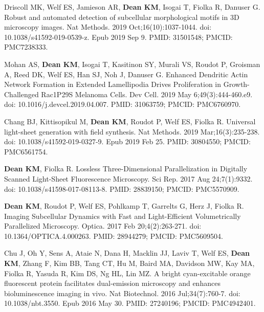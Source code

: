 \begin{etaremune}
\item Driscoll MK, Welf ES, Jamieson AR, \textbf{Dean KM}, Isogai T, Fiolka R, Danuser G. Robust and automated detection of subcellular morphological motifs in 3D microscopy images. Nat Methods. 2019 Oct;16(10):1037-1044. doi: 10.1038/s41592-019-0539-z. Epub 2019 Sep 9. PMID: 31501548; PMCID: PMC7238333.

\item Mohan AS, \textbf{Dean KM}, Isogai T, Kasitinon SY, Murali VS, Roudot P, Groisman A, Reed DK, Welf ES, Han SJ, Noh J, Danuser G. Enhanced Dendritic Actin Network Formation in Extended Lamellipodia Drives Proliferation in Growth-Challenged Rac1P29S Melanoma Cells. Dev Cell. 2019 May 6;49(3):444-460.e9. doi: 10.1016/j.devcel.2019.04.007. PMID: 31063759; PMCID: PMC6760970.

\item Chang BJ, Kittisopikul M, \textbf{Dean KM}, Roudot P, Welf ES, Fiolka R. Universal light-sheet generation with field synthesis. Nat Methods. 2019 Mar;16(3):235-238. doi: 10.1038/s41592-019-0327-9. Epub 2019 Feb 25. PMID: 30804550; PMCID: PMC6561754.

\item \textbf{Dean KM}, Fiolka R. Lossless Three-Dimensional Parallelization in Digitally Scanned Light-Sheet Fluorescence Microscopy. Sci Rep. 2017 Aug 24;7(1):9332. doi: 10.1038/s41598-017-08113-8. PMID: 28839150; PMCID: PMC5570909.

\item \textbf{Dean KM}, Roudot P, Welf ES, Pohlkamp T, Garrelts G, Herz J, Fiolka R. Imaging Subcellular Dynamics with Fast and Light-Efficient Volumetrically Parallelized Microscopy. Optica. 2017 Feb 20;4(2):263-271. doi: 10.1364/OPTICA.4.000263. PMID: 28944279; PMCID: PMC5609504.

\item Chu J, Oh Y, Sens A, Ataie N, Dana H, Macklin JJ, Laviv T, Welf ES, \textbf{Dean KM}, Zhang F, Kim BB, Tang CT, Hu M, Baird MA, Davidson MW, Kay MA, Fiolka R, Yasuda R, Kim DS, Ng HL, Lin MZ. A bright cyan-excitable orange fluorescent protein facilitates dual-emission microscopy and enhances bioluminescence imaging in vivo. Nat Biotechnol. 2016 Jul;34(7):760-7. doi: 10.1038/nbt.3550. Epub 2016 May 30. PMID: 27240196; PMCID: PMC4942401.


\end{etaremune}
